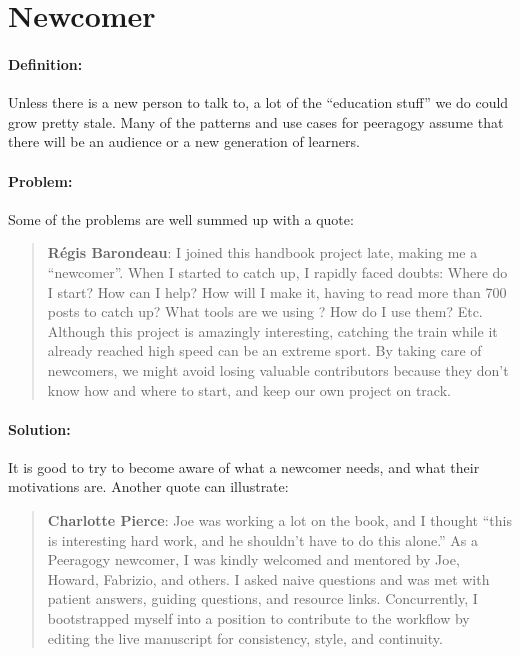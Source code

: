 \section{Newcomer}
\paragraph{Definition:} Unless there is a new person to talk to, a lot of
the ``education stuff'' we do could grow pretty stale. Many of the
patterns and use cases for peeragogy assume that there will be an
audience or a new generation of learners.

\paragraph{Problem:} Some of the problems are well summed up with a quote:

\begin{quote}
\textbf{Régis Barondeau}: I joined this handbook project late, making me
a ``newcomer''. When I started to catch up, I rapidly faced doubts:
Where do I start? How can I help? How will I make it, having to read
more than 700 posts to catch up? What tools are we using ? How do I use
them? Etc. Although this project is amazingly interesting, catching the
train while it already reached high speed can be an extreme sport. By
taking care of newcomers, we might avoid losing valuable contributors
because they don't know how and where to start, and keep our own project
on track.
\end{quote}

\paragraph{Solution:} It is good to try to become aware of what a newcomer
needs, and what their motivations are. Another quote can illustrate:

\begin{quote}
\textbf{Charlotte Pierce}: Joe was working a lot on the book, and I
thought ``this is interesting hard work, and he shouldn't have to do
this alone.'' As a Peeragogy newcomer, I was kindly welcomed and
mentored by Joe, Howard, Fabrizio, and others. I asked naive questions
and was met with patient answers, guiding questions, and resource links.
Concurrently, I bootstrapped myself into a position to contribute to the
workflow by editing the live manuscript for consistency, style, and
continuity.
\end{quote}

